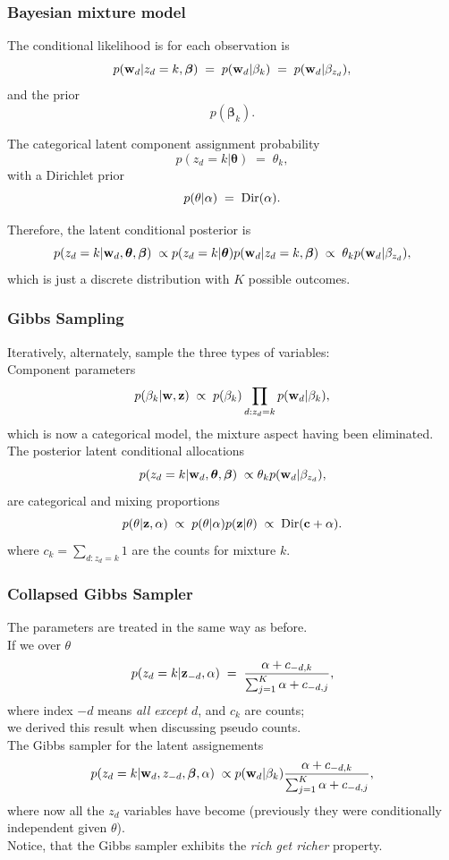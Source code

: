 \begin{frame}
\frametitle{Bayesian mixture model}

The conditional likelihood is for each observation is
\[
p({\bf w}_d|z_d=k,\boldsymbol\beta)\;=\;p({\bf
  w}_d|\beta_k)\;=\;p({\bf w}_d|\beta_{z_d}),
\]
and the prior
\[
p(\boldsymbol\beta_k).
\]

The categorical latent component assignment probability
\[
p(z_d=k|\boldsymbol\theta)\;=\;\theta_k,
\]
with a Dirichlet prior
\[
p(\theta|\alpha)\;=\;{\rm Dir}(\alpha).
\]

Therefore, the latent conditional posterior is
\[
p(z_d=k|{\bf w}_d,\boldsymbol\theta,\boldsymbol\beta)\;\propto
p(z_d=k|\boldsymbol\theta)p({\bf w}_d|z_d=k,\boldsymbol\beta)\;\propto\;
\theta_k p({\bf w}_d|\beta_{z_d}),
\]
which is just a discrete distribution with $K$ possible outcomes.
\end{frame}


\begin{frame}
\frametitle{Gibbs Sampling}

Iteratively, alternately, sample the three types of variables:\\[1ex]

Component parameters
\[
p(\beta_k|{\bf w},{\bf z})\;\propto\;p(\beta_k)\prod_{d:z_d=k}p({\bf w}_d|\beta_k),
\]
which is now a categorical model, the mixture aspect having been eliminated.\\[1ex]

The posterior latent conditional allocations
\[
p(z_d=k|{\bf w}_d,\boldsymbol\theta,\boldsymbol\beta)\;\propto \theta_k
p({\bf w}_d|\beta_{z_d}),
\]
are categorical and mixing proportions
\[
p(\theta|{\bf z},\alpha)\;\propto\;p(\theta|\alpha)p({\bf z}|\theta)\;\propto\;
{\rm Dir}({\bf c}+\alpha).
\]
where $c_k=\sum_{d:z_d=k}1$ are the counts for mixture $k$.
\end{frame}

\begin{frame}
\frametitle{Collapsed Gibbs Sampler}

The parameters are treated in the same way as before.\\[1ex]

If we  over $\theta$
\[
p(z_d=k|{\bf z}_{-d},\alpha)\;=\;\frac{\alpha+c_{-d,k}}{\sum_{j=1}^K\alpha+c_{-d,j}},
\]
where index $-d$ means \emph{all except} $d$, and $c_k$ are counts;\\
we derived this result when discussing pseudo counts.\\[1ex]

The  Gibbs sampler for the latent assignements
\[
p(z_d=k|{\bf w}_d,z_{-d},\boldsymbol\beta,\alpha)\;\propto
p({\bf w}_d|\beta_k)\frac{\alpha+c_{-d,k}}{\sum_{j=1}^K\alpha+c_{-d,j}},
\]
where now all the $z_d$ variables have become  (previously
they were conditionally independent given $\theta$).\\[1ex]

Notice, that the Gibbs sampler exhibits the \emph{rich get richer} property.
\end{frame}

